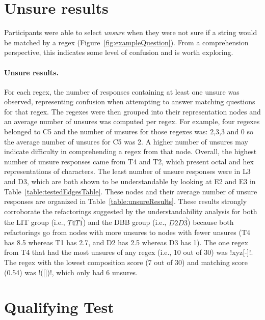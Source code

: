 \section*{Unsure results}
\label{app:unsureResults}
Participants were able to select \emph{unsure} when they were not sure if a string would be matched by a regex (Figure~\ref{fig:exampleQuestion}). From a comprehension perspective, this indicates some level of confusion and is worth exploring.



\paragraph{Unsure results.} For each regex, the number of responses containing at least one unsure was observed, representing confusion when attempting to answer matching questions for that regex.  The regexes were then grouped into their representation nodes and an average number of unsures was computed per regex.  For example, four regexes belonged to C5 and the number of unsures for those regexes was: 2,3,3 and 0 so the average number of unsures for C5 was 2.  A higher number of unsures may indicate difficulty in comprehending a regex from that node.  Overall, the highest number of unsure responses came from T4 and T2, which present octal and hex representations of characters. The least number of unsure responses were in L3 and D3, which are both shown to be understandable by looking at E2 and E3 in Table~\ref{table:testedEdgesTable}.  These nodes and their average number of unsure responses are organized in Table~\ref{table:unsureResults}.  These results strongly corroborate the refactorings suggested by the understandability analysis for both the LIT group (i.e., $\overrightarrow{T4 T1}$) and the DBB group (i.e.,  $\overrightarrow{D2 D3}$) because both refactorings go from nodes with more unsures to nodes with fewer unsures (T4 has 8.5 whereas T1 has 2.7, and D2 has 2.5 whereas D3 has 1).  The one regex from T4 that had the most unsures of any regex (i.e., 10 out of 30) was \cverb!xyz[-]!.  The regex with the lowest composition score (7 out of 30) and matching score (0.54) was \cverb!([])!, which only had 6 unsures.




\pagebreak
\section*{Qualifying Test}
\label{app:MTqualifyingTest}


